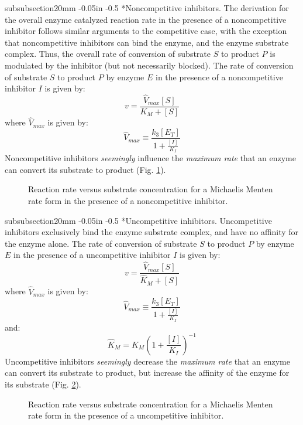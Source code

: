 \documentclass[11pt]{article}
\makeatletter
\theoremstyle{definition}
\renewcommand\subsubsection{\@startsection
	{subsubsection}{2}{0mm}
	{-0.05in}
	{-0.5\baselineskip}
	{\normalfont\normalsize\itshape}}
\makeatother
\begin{document}
\subsubsection*{Noncompetitive inhibitors.}
The derivation for the overall enzyme catalyzed reaction rate in the presence of a noncompetitive inhibitor
follows similar arguments to the competitive case, with the exception that noncompetitive inhibitors can bind the enzyme, and the enzyme substrate complex.
Thus, the overall rate of conversion of substrate $S$ to product $P$ is modulated by the inhibitor (but not necessarily blocked).
The rate of conversion of substrate $S$ to product $P$ by enzyme $E$ in the presence of a noncompetitive inhibitor $I$ is given by:
\begin{equation}
	v = \frac{\hat{V}_{max}\left[S\right]}{K_{M}+\left[S\right]}
\end{equation}where $\hat{V}_{max}$ is given by:
\begin{equation}
	\hat{V}_{max} \equiv \frac{k_{3}\left[E_{T}\right]}{1+\frac{\left[I\right]}{K_{I}}}
\end{equation}
Noncompetitive inhibitors \emph{seemingly} influence the \emph{maximum rate} that an enzyme can convert its substrate to product (Fig. \ref{fig-mm-plot-nci}).
\begin{figure}[!h]\centering
{}
\caption{Reaction rate versus substrate concentration for a Michaelis Menten rate form in the presence of a noncompetitive inhibitor.}\label{fig-mm-plot-nci}
\end{figure}

\subsubsection*{Uncompetitive inhibitors.}
Uncompetitive inhibitors exclusively bind the enzyme substrate complex, and have no affinity for the enzyme alone.
The rate of conversion of substrate $S$ to product $P$ by enzyme $E$ in the presence of a uncompetitive inhibitor $I$ is given by:
\begin{equation}
	v = \frac{\hat{V}_{max}\left[S\right]}{\hat{K}_{M}+\left[S\right]}
\end{equation}where $\hat{V}_{max}$ is given by:
\begin{equation}
	\hat{V}_{max} \equiv \frac{k_{3}\left[E_{T}\right]}{1+\frac{\left[I\right]}{K_{I}}}
\end{equation}and:
\begin{equation}
	\hat{K}_{M} = K_{M}\left({1+\frac{\left[I\right]}{K_{I}}}\right)^{-1}
\end{equation}
Uncompetitive inhibitors \emph{seemingly} decrease the \emph{maximum rate} that an enzyme can convert its substrate to product, but increase the affinity of the enzyme for its substrate (Fig. \ref{fig-mm-plot-uci}).
\begin{figure}[!ht]\centering
{}
\caption{Reaction rate versus substrate concentration for a Michaelis Menten rate form in the presence of a uncompetitive inhibitor.}\label{fig-mm-plot-uci}
\end{figure}

\clearpage


\end{document}
